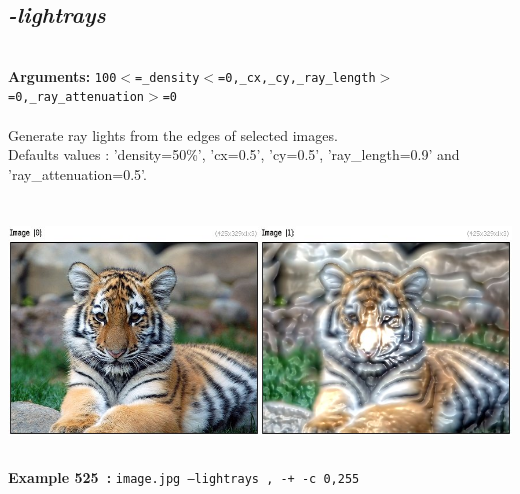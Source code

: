 \documentclass[a4paper,11pt,twoside]{book}
\begin{document}
\subsection{\emph{-lightrays} }\vspace*{-0.5em}
~\\\textbf{Arguments: } 
{\small \texttt{100$<$=\_density$<$=0,\_cx,\_cy,\_ray\_length$>$=0,\_ray\_attenuation$>$=0}}\\~\\
Generate ray lights from the edges of selected images.
~\\Defaults values : 'density=50\%', 'cx=0.5', 'cy=0.5', 'ray\_length=0.9' and 'ray\_attenuation=0.5'.
\begin{center}\includegraphics[keepaspectratio=true,height=7cm,width=\textwidth]{img/gmic_def525.jpg}\\
{\footnotesize \textbf{Example 525~:} \texttt{image.jpg --lightrays , -+ -c 0,255}}
\end{center}
\end{document}
